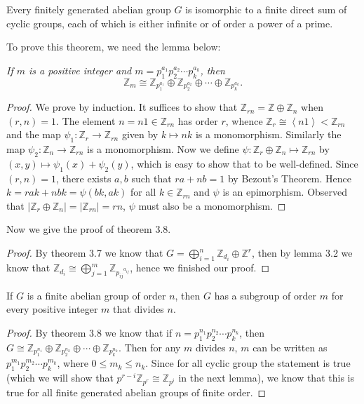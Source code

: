 \begin{theorem}
Every finitely generated abelian group $G$ is isomorphic to a finite direct sum of cyclic groups, each of which is either infinite or of order a power of a prime.
\end{theorem}
To prove this theorem, we need the lemma below:
\begin{lemma}\em
If $m$ is a positive integer and $m=p_1^{a_1}p_2^{a_2}\cdots p_k^{a_k}$, then 
$$\mathbb{Z}_m\cong\mathbb{Z}_{p_1^{a_1}}\oplus\mathbb{Z}_{p_2^{a_2}}\oplus\cdots\oplus\mathbb{Z}_{p_k^{a_k}}.$$
\end{lemma}
\begin{proof}
We prove by induction. It suffices to show that $\mathbb{Z}_{rn}=\mathbb{Z}\oplus\mathbb{Z}_n$ when $(r,n)=1$. The element $n=n1\in\mathbb{Z}_{rn}$ has order $r$, whence $\mathbb{Z}_r\cong\left<n1\right><\mathbb{Z}_{rn}$ and the map $\psi_1:\mathbb{Z}_r\to\mathbb{Z}_{rn}$ given by $k\mapsto nk$ is a monomorphism. Similarly the map $\psi_2:\mathbb{Z}_n\to\mathbb{Z}_{rn}$ is a monomorphism. Now we define $\psi:\mathbb{Z}_r\oplus\mathbb{Z}_n\mapsto\mathbb{Z}_{rn}$ by $(x,y)\mapsto\psi_1(x)+\psi_2(y)$, which is easy to show that to be well-defined. Since $(r,n)=1$, there exists $a,b$ such that $ra+nb=1$ by Bezout's Theorem. Hence $k=rak+nbk=\psi(bk,ak)$ for all $k\in\mathbb{Z}_{rn}$ and $\psi$ is an epimorphism. Observed that $|\mathbb{Z}_r\oplus\mathbb{Z}_n|=|\mathbb{Z}_{rn}|=rn$, $\psi$ must also be a monomorphism.
\end{proof}
Now we give the proof of theorem 3.8.
\begin{proof}
By theorem 3.7 we know that $G=\bigoplus_{i=1}^n\mathbb{Z}_{d_i}\oplus\mathbb{Z}^r$, then by lemma 3.2 we know that $\mathbb{Z}_{d_i}\cong\bigoplus_{j=1}^m\mathbb{Z}_{{p_{ij}}^{a_{ij}}}$, hence we finished our proof.
\end{proof}
\begin{corollary}
If $G$ is a finite abelian group of order $n$, then $G$ has a subgroup of order $m$ for every positive integer $m$ that divides $n$.
\end{corollary}
\begin{proof}
By theorem 3.8 we know that if $n=p_1^{n_1}p_2^{n_2}\cdots p_k^{n_k}$, then $G\cong\mathbb{Z}_{p_1^{n_1}}\oplus\mathbb{Z}_{p_2^{n_2}}\oplus\cdots\oplus\mathbb{Z}_{p_k^{n_k}}$. Then for any $m$ divides $n$, $m$ can be written as $p_1^{m_1}p_2^{m_2}\cdots p_k^{m_k}$, where $0\le m_k\le n_k$. Since for all cyclic group the statement is true (which we will show that $p^{r-i}\mathbb{Z}_{p^r}\cong\mathbb{Z}_{p^i}$ in the next lemma), we know that this is true for all finite generated abelian groups of finite order.
\end{proof}

